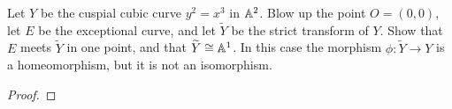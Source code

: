 \label{1.4.10}

Let $Y$ be the cuspial cubic curve $y^2 = x^3$ in $\mathbb A^2$. Blow up the point $O = (0, 0)$, let $E$ be the exceptional curve, and let $\widetilde{Y}$ be the strict transform of $Y$. Show that $E$ meets $\widetilde{Y}$ in one point, and that $\widetilde{Y} \cong \mathbb A^1$. In this case the morphism $\phi: \widetilde{Y} \longrightarrow Y$ is a homeomorphism, but it is not an isomorphism.

\begin{proof}

\end{proof}
